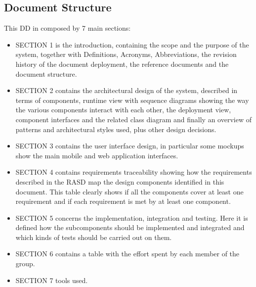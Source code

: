 	\subsection{Document Structure}
	This DD in composed by 7 main sections:
	\begin {itemize}
	 	\item SECTION 1 is the introduction, containing the scope and the purpose of the system, together with Definitions, Acronyms, Abbreviations, the revision history of the document deployment, the reference documents and the document structure.
		\item SECTION 2 contains the architectural design of the system, described in terms of components, runtime view with sequence diagrams showing the way the various components interact with each other, the deployment view, component interfaces and the related class diagram and finally an overview of patterns and architectural styles used, plus other design decisions.
		\item SECTION 3 contains the user interface design, in particular some mockups show the main mobile and web application interfaces.
		\item SECTION 4 contains requirements traceability showing how the requirements described in the RASD map the design components identified in this document. This table clearly shows if all the components cover at least one requirement and if each requirement is met by at least one component.
		\item SECTION 5 concerns the implementation, integration and testing. Here it is defined how the subcomponents should be implemented and integrated and which kinds of tests should be carried out on them.
		\item SECTION 6 contains a table with the effort spent by each member of the group.
		\item SECTION 7 tools used.
	\end{itemize}
	
